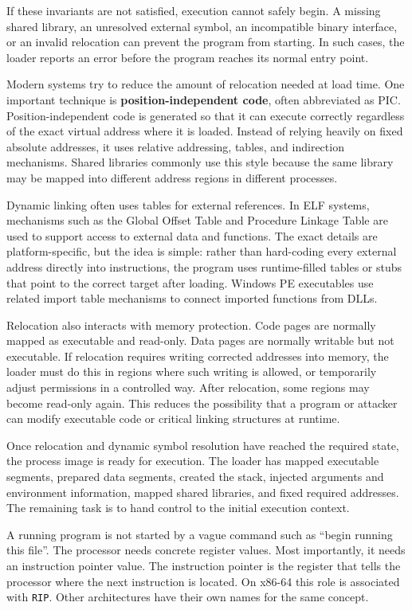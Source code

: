 If these invariants are not satisfied, execution cannot safely begin. A missing shared library, an unresolved external symbol, an incompatible binary interface, or an invalid relocation can prevent the program from starting. In such cases, the loader reports an error before the program reaches its normal entry point.

Modern systems try to reduce the amount of relocation needed at load time. One important technique is \textbf{position-independent code}, often abbreviated as PIC. Position-independent code is generated so that it can execute correctly regardless of the exact virtual address where it is loaded. Instead of relying heavily on fixed absolute addresses, it uses relative addressing, tables, and indirection mechanisms. Shared libraries commonly use this style because the same library may be mapped into different address regions in different processes.

Dynamic linking often uses tables for external references. In ELF systems, mechanisms such as the Global Offset Table and Procedure Linkage Table are used to support access to external data and functions. The exact details are platform-specific, but the idea is simple: rather than hard-coding every external address directly into instructions, the program uses runtime-filled tables or stubs that point to the correct target after loading. Windows PE executables use related import table mechanisms to connect imported functions from DLLs.

Relocation also interacts with memory protection. Code pages are normally mapped as executable and read-only. Data pages are normally writable but not executable. If relocation requires writing corrected addresses into memory, the loader must do this in regions where such writing is allowed, or temporarily adjust permissions in a controlled way. After relocation, some regions may become read-only again. This reduces the possibility that a program or attacker can modify executable code or critical linking structures at runtime.

Once relocation and dynamic symbol resolution have reached the required state, the process image is ready for execution. The loader has mapped executable segments, prepared data segments, created the stack, injected arguments and environment information, mapped shared libraries, and fixed required addresses. The remaining task is to hand control to the initial execution context.

A running program is not started by a vague command such as ``begin running this file''. The processor needs concrete register values. Most importantly, it needs an instruction pointer value. The instruction pointer is the register that tells the processor where the next instruction is located. On x86-64 this role is associated with \texttt{RIP}. Other architectures have their own names for the same concept.

